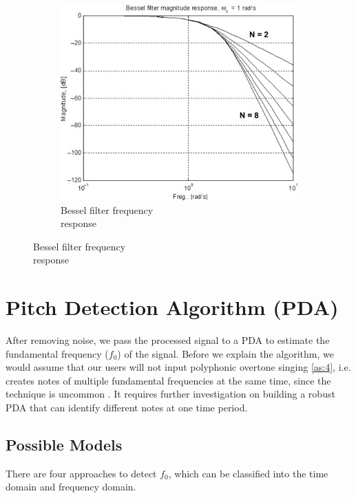 \begin{figure}[h]
\begin{subfigure}{.4\textwidth}
		\includegraphics[width=1\linewidth]{Figures/bessel.jpg}
		\caption{Bessel filter frequency\\response}
		\label{fig:sub3}
	\end{subfigure}

\end{figure}

\section{Pitch Detection Algorithm (PDA)}
\label{sec:PDA}
After removing noise, we pass the processed signal to a PDA to estimate the fundamental frequency ($f_0$) of
the signal. Before we explain the algorithm, we would assume that our users will not input polyphonic overtone 
singing \cref{as:4}, i.e. creates notes of multiple fundamental frequencies at the same time, since the technique is uncommon
. It requires further investigation on building a robust PDA that can identify different notes at one time period.

\subsection{Possible Models}
There are four approaches to detect $f_0$, which can be classified into the time domain and frequency domain.

